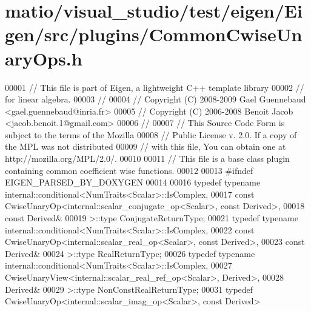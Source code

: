 \hypertarget{matio_2visual__studio_2test_2eigen_2_eigen_2src_2plugins_2_common_cwise_unary_ops_8h_source}{}\section{matio/visual\+\_\+studio/test/eigen/\+Eigen/src/plugins/\+Common\+Cwise\+Unary\+Ops.h}
\label{matio_2visual__studio_2test_2eigen_2_eigen_2src_2plugins_2_common_cwise_unary_ops_8h_source}

\begin{DoxyCode}
00001 \textcolor{comment}{// This file is part of Eigen, a lightweight C++ template library}
00002 \textcolor{comment}{// for linear algebra.}
00003 \textcolor{comment}{//}
00004 \textcolor{comment}{// Copyright (C) 2008-2009 Gael Guennebaud <gael.guennebaud@inria.fr>}
00005 \textcolor{comment}{// Copyright (C) 2006-2008 Benoit Jacob <jacob.benoit.1@gmail.com>}
00006 \textcolor{comment}{//}
00007 \textcolor{comment}{// This Source Code Form is subject to the terms of the Mozilla}
00008 \textcolor{comment}{// Public License v. 2.0. If a copy of the MPL was not distributed}
00009 \textcolor{comment}{// with this file, You can obtain one at http://mozilla.org/MPL/2.0/.}
00010 
00011 \textcolor{comment}{// This file is a base class plugin containing common coefficient wise functions.}
00012 
00013 \textcolor{preprocessor}{#ifndef EIGEN\_PARSED\_BY\_DOXYGEN}
00014 
00016 \textcolor{keyword}{typedef} \textcolor{keyword}{typename} internal::conditional<NumTraits<Scalar>::IsComplex,
00017                     \textcolor{keyword}{const} CwiseUnaryOp<internal::scalar\_conjugate\_op<Scalar>, \textcolor{keyword}{const} Derived>,
00018                     \textcolor{keyword}{const} Derived&
00019                   >::type ConjugateReturnType;
00021 \textcolor{keyword}{typedef} \textcolor{keyword}{typename} internal::conditional<NumTraits<Scalar>::IsComplex,
00022                     \textcolor{keyword}{const} CwiseUnaryOp<internal::scalar\_real\_op<Scalar>, \textcolor{keyword}{const} Derived>,
00023                     \textcolor{keyword}{const} Derived&
00024                   >::type RealReturnType;
00026 \textcolor{keyword}{typedef} \textcolor{keyword}{typename} internal::conditional<NumTraits<Scalar>::IsComplex,
00027                     CwiseUnaryView<internal::scalar\_real\_ref\_op<Scalar>, Derived>,
00028                     Derived&
00029                   >::type NonConstRealReturnType;
00031 \textcolor{keyword}{typedef} CwiseUnaryOp<internal::scalar\_imag\_op<Scalar>, \textcolor{keyword}{const} Derived> 

\end{DoxyCode}
